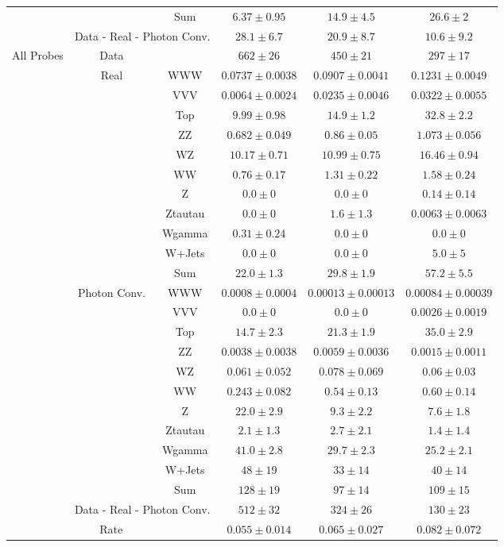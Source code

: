\begin{tabular}{|c|cc||c|c|c|}
\cline{3-6}
&& Sum &  $6.37 \pm 0.95$ &  $14.9 \pm 4.5$ &  $26.6 \pm 2$\\ 
\cline{2-6}
\cline{2-6}
&\multicolumn{2}{|c||}{Data - Real - Photon Conv.} &  $28.1 \pm 6.7$ &  $20.9 \pm 8.7$ &  $10.6 \pm 9.2$\\ 
\hline
\hline
\multirow{23}{*}{All Probes} & Data & &  $662 \pm 26$ &  $450 \pm 21$ &  $297 \pm 17$\\ 
\cline{2-6}
&\multirow{11}{*}{Real}& WWW &  $0.0737 \pm 0.0038$ &  $0.0907 \pm 0.0041$ &  $0.1231 \pm 0.0049$\\ 
&& VVV &  $0.0064 \pm 0.0024$ &  $0.0235 \pm 0.0046$ &  $0.0322 \pm 0.0055$\\ 
&& Top &  $9.99 \pm 0.98$ &  $14.9 \pm 1.2$ &  $32.8 \pm 2.2$\\ 
&& ZZ &  $0.682 \pm 0.049$ &  $0.86 \pm 0.05$ &  $1.073 \pm 0.056$\\ 
&& WZ &  $10.17 \pm 0.71$ &  $10.99 \pm 0.75$ &  $16.46 \pm 0.94$\\ 
&& WW &  $0.76 \pm 0.17$ &  $1.31 \pm 0.22$ &  $1.58 \pm 0.24$\\ 
&& Z &  $0.0 \pm 0$ &  $0.0 \pm 0$ &  $0.14 \pm 0.14$\\ 
&& Ztautau &  $0.0 \pm 0$ &  $1.6 \pm 1.3$ &  $0.0063 \pm 0.0063$\\ 
&& Wgamma &  $0.31 \pm 0.24$ &  $0.0 \pm 0$ &  $0.0 \pm 0$\\ 
&& W+Jets &  $0.0 \pm 0$ &  $0.0 \pm 0$ &  $5.0 \pm 5$\\ 
\cline{3-6}
&& Sum &  $22.0 \pm 1.3$ &  $29.8 \pm 1.9$ &  $57.2 \pm 5.5$\\ 
\cline{2-6}
\cline{2-6}
&\multirow{11}{*}{Photon Conv.}& WWW &  $0.0008 \pm 0.0004$ &  $0.00013 \pm 0.00013$ &  $0.00084 \pm 0.00039$\\ 
&& VVV &  $0.0 \pm 0$ &  $0.0 \pm 0$ &  $0.0026 \pm 0.0019$\\ 
&& Top &  $14.7 \pm 2.3$ &  $21.3 \pm 1.9$ &  $35.0 \pm 2.9$\\ 
&& ZZ &  $0.0038 \pm 0.0038$ &  $0.0059 \pm 0.0036$ &  $0.0015 \pm 0.0011$\\ 
&& WZ &  $0.061 \pm 0.052$ &  $0.078 \pm 0.069$ &  $0.06 \pm 0.03$\\ 
&& WW &  $0.243 \pm 0.082$ &  $0.54 \pm 0.13$ &  $0.60 \pm 0.14$\\ 
&& Z &  $22.0 \pm 2.9$ &  $9.3 \pm 2.2$ &  $7.6 \pm 1.8$\\ 
&& Ztautau &  $2.1 \pm 1.3$ &  $2.7 \pm 2.1$ &  $1.4 \pm 1.4$\\ 
&& Wgamma &  $41.0 \pm 2.8$ &  $29.7 \pm 2.3$ &  $25.2 \pm 2.1$\\ 
&& W+Jets &  $ 48 \pm 19$ &  $ 33 \pm 14$ &  $ 40 \pm 14$\\ 
\cline{3-6}
&& Sum &  $128 \pm 19$ &  $ 97 \pm 14$ &  $109 \pm 15$\\ 
\cline{2-6}
\cline{2-6}
&\multicolumn{2}{|c||}{Data - Real - Photon Conv.} &  $512 \pm 32$ &  $324 \pm 26$ &  $130 \pm 23$\\ 
\hline
\hline
\multicolumn{3}{|c||}{Rate} &  $0.055 \pm 0.014$ &  $0.065 \pm 0.027$ &  $0.082 \pm 0.072$\\ 
\hline
\end{tabular}
